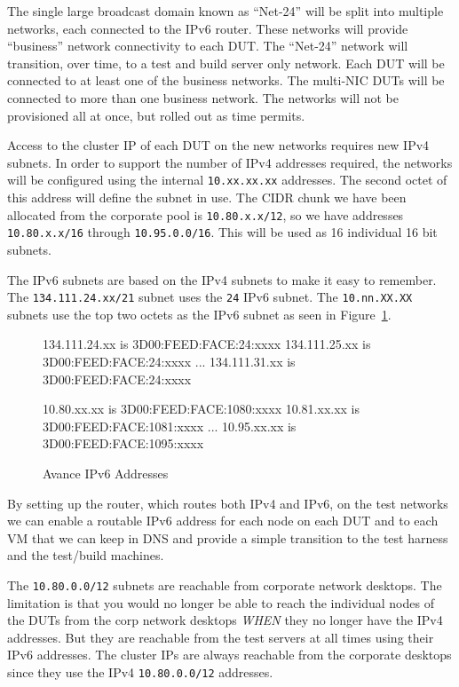 \documentclass[twoside]{article}
\begin{document}
The single large broadcast domain known as ``Net-24'' will be split into 
multiple networks, each connected to the IPv6 router.
These networks will provide ``business'' network connectivity to each DUT.
The ``Net-24'' network will transition, over time, to a test and build
server only network.
Each DUT will be connected to at least one of the business networks.
The multi-NIC DUTs will be connected to more than one business network.
The networks will not be provisioned all at once,
but rolled out as time permits.

Access to the cluster IP of each DUT on the new networks requires new
IPv4 subnets.
In order to support the number of IPv4 addresses required,
the networks will be configured using the internal \verb+10.xx.xx.xx+ addresses.
The second octet of this address will define the subnet in use.
The CIDR chunk we have been allocated from the corporate pool is
\verb+10.80.x.x/12+, so we have addresses \verb+10.80.x.x/16+ through \verb+10.95.0.0/16+.
This will be used as 16 individual 16 bit subnets.

The IPv6 subnets are based on the IPv4 subnets to make it easy to remember.
The \verb+134.111.24.xx/21+ subnet uses the \verb+24+ IPv6 subnet.
The \verb+10.nn.XX.XX+ subnets use the top two octets as the IPv6 subnet
as seen in Figure~\ref{ipv6:address:avance}.

\begin{figure}[!h]
\begin{center}
\begin{boxedverbatim}
134.111.24.xx is 3D00:FEED:FACE:24:xxxx
134.111.25.xx is 3D00:FEED:FACE:24:xxxx
...
134.111.31.xx is 3D00:FEED:FACE:24:xxxx

10.80.xx.xx is 3D00:FEED:FACE:1080:xxxx
10.81.xx.xx is 3D00:FEED:FACE:1081:xxxx
...
10.95.xx.xx is 3D00:FEED:FACE:1095:xxxx
\end{boxedverbatim}
\end{center}
\caption{Avance IPv6 Addresses}\label{ipv6:address:avance}
\end{figure}


By setting up the router, which routes both IPv4 and IPv6,
on the test networks we can enable a routable IPv6 address for each node on each DUT
and to each VM that we can keep in DNS and provide a simple transition to the test
harness and the test/build machines.

The \verb+10.80.0.0/12+ subnets are reachable from corporate network desktops.
The limitation is that you would no longer be able to reach the individual nodes of the
DUTs from the corp network desktops {\em WHEN} they no longer have the IPv4 addresses.
But they are reachable from the test servers at all times using their IPv6 addresses.
The cluster IPs are always reachable from the corporate desktops since they
use the IPv4 \verb+10.80.0.0/12+ addresses.
\end{document}
